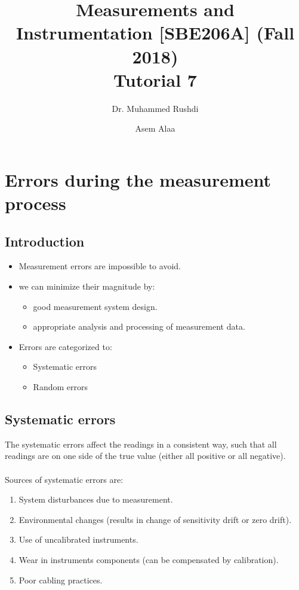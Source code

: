 \documentclass[a4paper,11pt]{book}
\begin{document}
\author{Dr. Muhammed Rushdi \and Asem Alaa}

\title{Measurements and Instrumentation [SBE206A] (Fall 2018)\\ Tutorial 7}

\maketitle


\chapter*{Errors during the measurement process}

\section*{Introduction}
\begin{itemize}
\item Measurement errors are impossible to avoid.
\item we can minimize their magnitude by: 
\begin{itemize}
\item good measurement system design.
\item appropriate analysis and processing of measurement data.
\end{itemize} 
\item Errors are categorized to:
\begin{itemize}
\item Systematic errors
\item Random errors
\end{itemize}
\end{itemize}

\section*{Systematic errors}

The systematic errors affect the readings in a consistent way, such that all readings are on one side of the true value (either all positive or all negative).\\
\\
Sources of systematic errors are:
\begin{enumerate}
\item System disturbances due to measurement.
\item Environmental changes (results in change of sensitivity drift or zero drift).
\item Use of uncalibrated instruments.
\item Wear in instruments components (can be compensated by calibration).
\item Poor cabling practices.
\end{enumerate}
\end{document}
